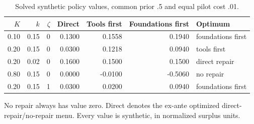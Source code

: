 \begin{table}[ht]\centering\small
\caption{Solved synthetic policy values, common prior .5 and equal pilot cost .01.}
\begin{tabular}{rrrrrrl}\toprule
$K$ & $k$ & $\zeta$ & Direct & Tools first & Foundations first & Optimum\\\midrule
0.10 & 0.15 & 0 & 0.1300 & 0.1558 & 0.1940 & foundations first\\
0.20 & 0.15 & 0 & 0.0300 & 0.1218 & 0.0940 & tools first\\
0.20 & 0.02 & 0 & 0.1600 & 0.1500 & 0.1500 & direct repair\\
0.80 & 0.15 & 0 & 0.0000 & -0.0100 & -0.5060 & no repair\\
0.20 & 0.15 & 1 & 0.0300 & 0.0200 & 0.0940 & foundations first\\
\bottomrule\end{tabular}
\par\smallskip\footnotesize No repair always has value zero. Direct denotes the ex-ante optimized direct-repair/no-repair menu. Every value is synthetic, in normalized surplus units.
\end{table}